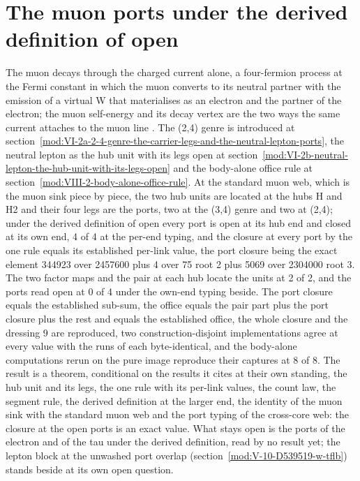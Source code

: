 \section{The muon ports under the derived definition of open}\label{mod:VI-2a-D539543-mprt-t1}
The muon decays through the charged current alone, a four-fermion process at the Fermi constant in which the muon converts to its neutral partner with the emission of a virtual W that materialises as an electron and the partner of the electron; the muon self-energy and its decay vertex are the two ways the same current attaches to the muon line \cite{Fermi1934,Weinberg1967,Peskin1995}. The (2,4) genre is introduced at section~\ref{mod:VI-2a-2-4-genre-the-carrier-legs-and-the-neutral-lepton-ports}, the neutral lepton as the hub unit with its legs open at section~\ref{mod:VI-2b-neutral-lepton-the-hub-unit-with-its-legs-open} and the body-alone office rule at section~\ref{mod:VIII-2-body-alone-office-rule}.
At the standard muon web, which is the muon sink piece by piece, the two hub units are located at the hubs H and H2 and their four legs are the ports, two at the (3,4) genre and two at (2,4); under the derived definition of open every port is open at its hub end and closed at its own end, 4 of 4 at the per-end typing, and the closure at every port by the one rule equals its established per-link value, the port closure being the exact element 344923 over 2457600 plus 4 over 75 root 2 plus 5069 over 2304000 root 3.
The two factor maps and the pair at each hub locate the units at 2 of 2, and the ports read open at 0 of 4 under the own-end typing beside. The port closure equals the established sub-sum, the office equals the pair part plus the port closure plus the rest and equals the established office, the whole closure and the dressing 9 are reproduced, two construction-disjoint implementations agree at every value with the runs of each byte-identical, and the body-alone computations rerun on the pure image reproduce their captures at 8 of 8.
The result is a theorem, conditional on the results it cites at their own standing, the hub unit and its legs, the one rule with its per-link values, the count law, the segment rule, the derived definition at the larger end, the identity of the muon sink with the standard muon web and the port typing of the cross-core web: the closure at the open ports is an exact value.
What stays open is the ports of the electron and of the tau under the derived definition, read by no result yet; the lepton block at the unwashed port overlap (section~\ref{mod:V-10-D539519-w-tflb}) stands beside at its own open question.

